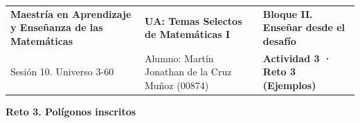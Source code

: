 \documentclass[spanish,letterpaper,landscape]{article}
\begin{document}
\newpage
\noindent
\begin{tabularx}{\textwidth}{@{} >{\raggedright\arraybackslash}p{} >{\centering\arraybackslash}X >{\raggedleft\arraybackslash}p{} @{}}
\footnotesize \textbf{Maestría en Aprendizaje y Enseñanza de las Matemáticas} &
\footnotesize \textbf{UA: Temas Selectos de Matemáticas I} &
\footnotesize \textbf{Bloque II. Enseñar desde el desafío} \\
\footnotesize Sesión 10. Universo 3-60 &
\footnotesize Alumno: Martín Jonathan de la Cruz Muñoz (00874) &
\footnotesize \textbf{Actividad 3 · Reto 3 (Ejemplos)}
\end{tabularx}

\vspace{4pt}
\begin{center}
  {\normalsize\bfseries Reto 3. Polígonos inscritos}
\end{center}
\vspace{4pt}
\renewcommand{\arraystretch}{1.35}
\end{document}

